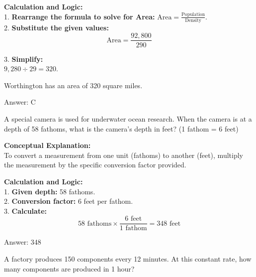 \documentclass[11pt,paper=a4,answers]{exam}
\begin{document}
\begin{questions}
\begin{solution}
\vspace{30pt}

\textbf{Calculation and Logic:} \\
1. \textbf{Rearrange the formula to solve for Area:} $\text{Area} = \frac{\text{Population}}{\text{Density}}$. \\
2. \textbf{Substitute the given values:} 
\[ \text{Area} = \frac{92,800}{290} \]

\vspace{15pt}

3. \textbf{Simplify:} \\
$9,280 \div 29 = 320$.

\vspace{10pt}

Worthington has an area of 320 square miles.

\vspace{30pt}

Answer: \colorbox{yellow!100}{C}
\end{solution}

\vspace{60pt}

\question
A special camera is used for underwater ocean research. When the camera is at a depth of 58 fathoms, what is the camera's depth in feet? (1 fathom = 6 feet)

\begin{solution}
\textbf{Conceptual Explanation:} \\
To convert a measurement from one unit (fathoms) to another (feet), multiply the measurement by the specific conversion factor provided.

\vspace{30pt}

\textbf{Calculation and Logic:} \\
1. \textbf{Given depth:} 58 fathoms. \\
2. \textbf{Conversion factor:} 6 feet per fathom. \\
3. \textbf{Calculate:} 
\[ 58 \text{ fathoms} \times \frac{6 \text{ feet}}{1 \text{ fathom}} = 348 \text{ feet} \]

\vspace{30pt}

Answer: \colorbox{yellow!100}{348}
\end{solution}

\question
A factory produces 150 components every 12 minutes. At this constant rate, how many components are produced in 1 hour?


\end{questions}
\end{document}
